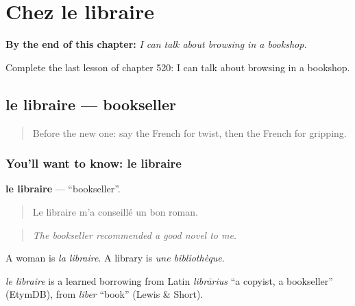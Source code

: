 
\chapter{Chez le libraire}
\label{ch:fr-chez-le-libraire}

\begin{chapteropening}
\textbf{By the end of this chapter:} \emph{I can talk about browsing in a bookshop.}

Complete the last lesson of chapter 520: I can talk about browsing in a bookshop.
\end{chapteropening}

\section[le libraire]{le libraire — bookseller}

\label{lesson:FR-C520-libraire}



\begin{quote}
Before the new one: say the French for twist, then the French for gripping.
\end{quote}

\subsection*{You'll want to know: le libraire}
\textbf{le libraire} — \textquotedblleft{}bookseller\textquotedblright{}.

\begin{quote}
Le libraire m'a conseillé un bon roman.
\end{quote}

\begin{quote}
\emph{The bookseller recommended a good novel to me.}
\end{quote}

A woman is \emph{la libraire}. A library is \emph{une bibliothèque}.

\begin{cousinweb}
\emph{le libraire} is a learned borrowing from Latin \emph{librārius} \textquotedblleft{}a copyist, a bookseller\textquotedblright{} (EtymDB), from \emph{liber} \textquotedblleft{}book\textquotedblright{} (Lewis \& Short).
\end{cousinweb}


